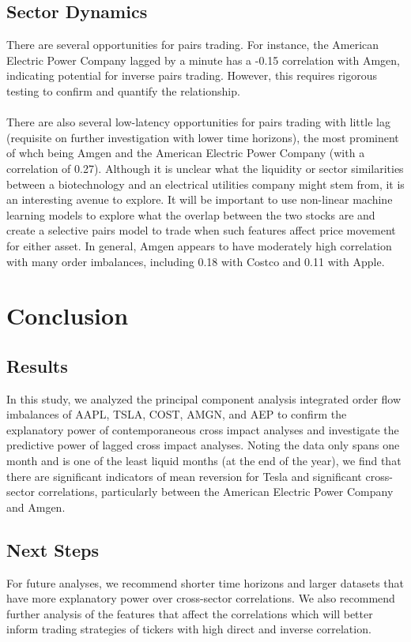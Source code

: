 \documentclass{article}
\begin{document}
\subsection{Sector Dynamics}
There are several opportunities for pairs trading. For instance, the American Electric Power Company lagged by a minute has a -0.15 correlation with Amgen, indicating potential for inverse pairs trading. However, this requires rigorous testing to confirm and quantify the relationship.\\\\
There are also several low-latency opportunities for pairs trading with little lag (requisite on further investigation with lower time horizons), the most prominent of whch being Amgen and the American Electric Power Company (with a correlation of 0.27). Although it is unclear what the liquidity or sector similarities between a biotechnology and an electrical utilities company might stem from, it is an interesting avenue to explore. It will be important to use non-linear machine learning models to explore what the overlap between the two stocks are and create a selective pairs model to trade when such features affect price movement for either asset. In general, Amgen appears to have moderately high correlation with many order imbalances, including 0.18 with Costco and 0.11 with Apple.

\section{Conclusion}
\subsection{Results}
In this study, we analyzed the principal component analysis integrated order flow imbalances of AAPL, TSLA, COST, AMGN, and AEP to confirm the explanatory power of contemporaneous cross impact analyses and investigate the predictive power of lagged cross impact analyses. Noting the data only spans one month and is one of the least liquid months (at the end of the year), we find that there are significant indicators of mean reversion for Tesla and significant cross-sector correlations, particularly between the American Electric Power Company and Amgen. 

\subsection{Next Steps}
For future analyses, we recommend shorter time horizons and larger datasets that have more explanatory power over cross-sector correlations. We also recommend further analysis of the features that affect the correlations which will better inform trading strategies of tickers with high direct and inverse correlation. 



\end{document}
